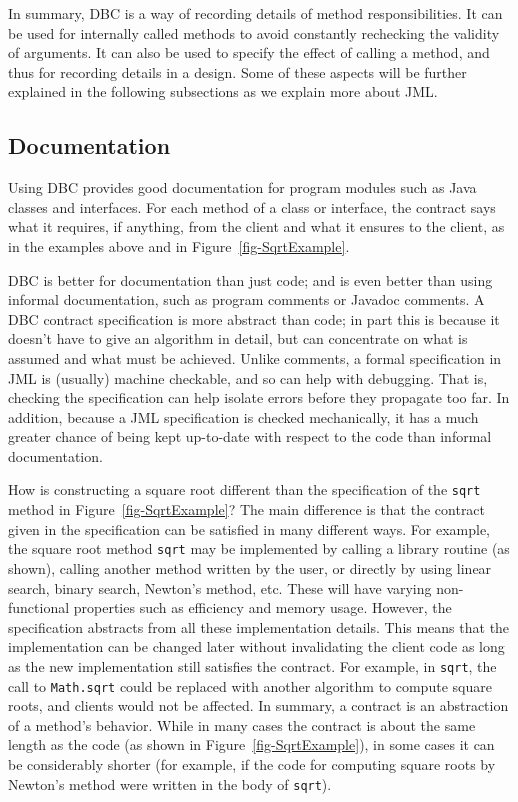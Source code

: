 \documentclass[twocolumn]{article}
\begin{document}
In summary, DBC is a way of recording details of method
responsibilities. It can be used for internally called methods to 
avoid constantly rechecking the validity of arguments.
It can also be used to specify the effect of calling a method, and
thus for recording details in a design.
Some of these aspects will be further explained in the following
subsections as we explain more about JML.

\subsection{Documentation}

Using DBC provides good documentation for program modules such as Java
classes and interfaces. For each method of a class or interface, the contract
says what it requires, if anything, from the client and what it
ensures to the client, as in the examples above and in
Figure~\ref{fig-SqrtExample}. 

DBC is better for documentation than just code;
and is even better than using informal documentation, such as program
comments or Javadoc comments.
A DBC contract specification is more abstract than code; in part this
is because it doesn't have to give an algorithm in detail, but can
concentrate on what is assumed and what must be achieved.
Unlike comments, a formal specification in JML is (usually)
machine checkable, and so can help with debugging.
That is, checking the specification can help isolate errors before
they propagate too far.
In addition, because a JML specification is checked mechanically, it
has a much greater chance of being kept up-to-date with respect to the
code than informal documentation.


How is constructing a square root different than the specification of
the \texttt{sqrt} method in Figure~\ref{fig-SqrtExample}?
The main difference is that the contract given in the specification
can be satisfied in many different ways. 
For example, the square root method \texttt{sqrt} may be implemented
by calling a library routine (as shown), calling another method
written by the user, or directly by using linear search, binary
search, Newton's method, etc.  These will have varying non-functional
properties such as efficiency and memory usage.  However, the
specification abstracts from all these 
implementation details. This means that the implementation can
be changed later without invalidating the client code as long as the new
implementation still satisfies the contract.  For example, in
\texttt{sqrt}, the call to \texttt{Math.sqrt} could be replaced
with another algorithm to compute square roots, and clients would not be
affected. In summary, a contract
is an abstraction of a method's behavior.
While in many cases the contract is about the same length as the code
(as shown in Figure~\ref{fig-SqrtExample}),
in some cases it can be considerably shorter (for example, if the code
for computing square roots by Newton's method were written in the body
of \texttt{sqrt}).
\end{document}
